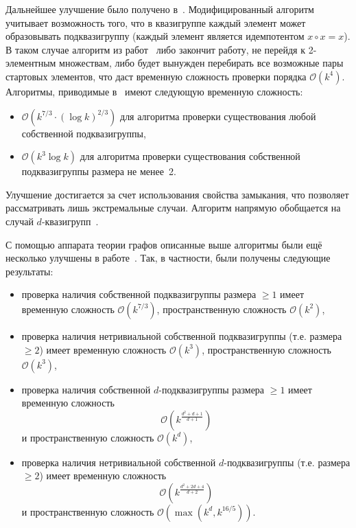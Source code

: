     Дальнейшее улучшение было получено в~\cite{galatenko21subquasi}. 
    Модифицированный алгоритм учитывает возможность того, что в квазигруппе каждый элемент может образовывать подквазигруппу (каждый элемент является идемпотентом $x \circ x = x$).
    В таком случае алгоритм из работ~\cite{toropov18, sobyanin19} либо закончит работу, не перейдя к 2-элементным множествам, либо будет вынужден перебирать все возможные пары стартовых элементов, что даст временную сложность проверки порядка $\mathcal{O}(k^4)$.
    Алгоритмы, приводимые в~\cite{galatenko21subquasi} имеют следующую временную сложность:
    \begin{itemize}
        \item $\mathcal{O}(k^{7/3} \cdot \left( \log k \right)^{2/3})$ для алгоритма проверки существования любой собственной подквазигруппы, 
        \item $\mathcal{O}(k^3 \log k)$ для алгоритма проверки существования собственной подквазигруппы размера не менее~2.
    \end{itemize}
    Улучшение достигается за счет использования свойства  замыкания, что позволяет рассматривать лишь экстремальные случаи.
    Алгоритм напрямую обобщается на случай $d$-квазигрупп~\cite{galatenko21nsubquasi}.

    С помощью аппарата теории графов описанные выше алгоритмы были ещё несколько улучшены в работе~\cite{mazurin23}.
    Так, в частности, были получены следующие результаты:
    \begin{itemize}
        \item проверка наличия собственной подквазигруппы размера $\ge 1$ имеет временную сложность $\mathcal{O}(k^{7/3})$, пространственную сложность $\mathcal{O}(k^{2})$,
        \item проверка наличия нетривиальной собственной подквазигруппы (т.е. размера $\ge 2$) имеет временную сложность $\mathcal{O}(k^{3})$, пространственную сложность $\mathcal{O}(k^{3})$,
        \item проверка наличия собственной $d$-подквазигруппы размера $\ge 1$ имеет временную сложность 
        \[
            \mathcal{O}(k^{\frac{d^2 + d + 1}{d + 1}})
        \]
        и пространственную сложность $\mathcal{O}(k^{d})$,
        \item проверка наличия нетривиальной собственной $d$-подквазигруппы (т.е. размера $\ge 2$) имеет временную сложность 
        \[
            \mathcal{O}(k^{\frac{d^2 + 2d + 4}{d + 2}})
        \]
        и пространственную сложность $\mathcal{O}\left( \max \left(k^{d}, k^{16/5} \right) \right)$.
    \end{itemize}

